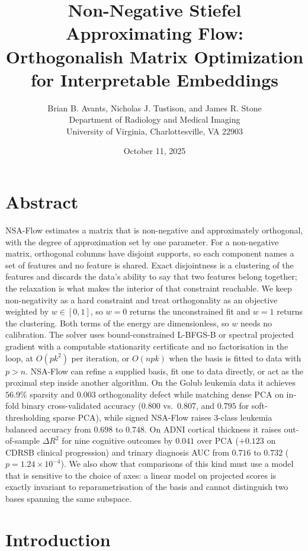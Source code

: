 \documentclass[
]{article}
\title{Non-Negative Stiefel Approximating Flow: Orthogonalish Matrix Optimization for Interpretable Embeddings}
\author{Brian B. Avants, Nicholas J. Tustison, and James R. Stone\\
Department of Radiology and Medical Imaging\\
University of Virginia, Charlottesville, VA 22903}
\date{October 11, 2025}
\begin{document}
\maketitle

\section*{Abstract}\label{abstract}

NSA-Flow estimates a matrix that is non-negative and approximately orthogonal, with the degree of approximation set by one parameter. For a non-negative matrix, orthogonal columns have disjoint supports, so each component names a set of features and no feature is shared. Exact disjointness is a clustering of the features and discards the data's ability to say that two features belong together; the relaxation is what makes the interior of that constraint reachable. We keep non-negativity as a hard constraint and treat orthogonality as an objective weighted by \(w \in [0,1]\), so \(w = 0\) returns the unconstrained fit and \(w = 1\) returns the clustering. Both terms of the energy are dimensionless, so \(w\) needs no calibration. The solver uses bound-constrained L-BFGS-B or spectral projected gradient with a computable stationarity certificate and no factorisation in the loop, at \(O(pk^2)\) per iteration, or \(O(npk)\) when the basis is fitted to data with \(p > n\). NSA-Flow can refine a supplied basis, fit one to data directly, or act as the proximal step inside another algorithm. On the Golub leukemia data it achieves \(56.9\%\) sparsity and \(0.003\) orthogonality defect while matching dense PCA on in-fold binary cross-validated accuracy (\(0.800\) vs.~\(0.807\), and \(0.795\) for soft-thresholding sparse PCA), while signed NSA-Flow raises 3-class leukemia balanced accuracy from \(0.698\) to \(0.748\). On ADNI cortical thickness it raises out-of-sample \(\Delta R^2\) for nine cognitive outcomes by \(0.041\) over PCA (\(+0.123\) on CDRSB clinical progression) and trinary diagnosis AUC from \(0.716\) to \(0.732\) (\(p = 1.24 \times 10^{-4}\)). We also show that comparisons of this kind must use a model that is sensitive to the choice of axes: a linear model on projected scores is exactly invariant to reparametrisation of the basis and cannot distinguish two bases spanning the same subspace.

\section{Introduction}\label{introduction}
\end{document}
